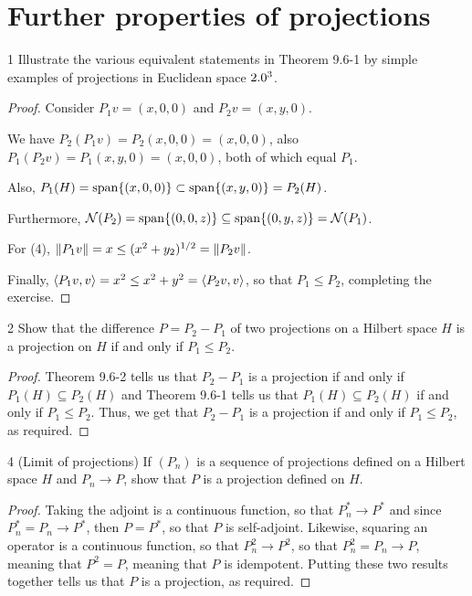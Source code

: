 \section{Further properties of projections}


\begin{exercise}{1}
Illustrate the various equivalent statements in Theorem 9.6-1 by simple examples of projections in Euclidean space $2.0^3$.
\end{exercise}
\begin{proof}
Consider $P_1 v = (x, 0, 0)$ and $P_2 v = (x, y, 0)$.

We have $P_2 (P_1 v) = P_2 (x, 0, 0) = (x, 0, 0)$, also $P_1 (P_2 v) = P_1 (x, y, 0) = (x, 0, 0)$, both of which equal $P_1$.

Also, $P_1(H) = \operatorname*{span}\{(x, 0, 0)\} \subset \operatorname*{span}\{(x, y, 0)\} = P_2(H)$.

Furthermore, $\mathcal{N}(P_2) = \operatorname*{span}\{(0, 0, z)\} \subseteq \operatorname*{span}\{(0, y, z)\} = 
\mathcal{N}(P_1)$.

For (4), $\left\lVert P_1 v\right\rVert = x \leq (x^2 + y_2)^{1/2} = \left\lVert P_2 v\right\rVert$.

Finally, $\langle P_1 v, v\rangle = x^2 \leq x^2 + y^2 = \langle P_2 v, v\rangle$, so that $P_1 \leq P_2$, completing the exercise.
\end{proof} 

\begin{exercise}{2}
Show that the difference $P = P_2 - P_1$ of two projections on a Hilbert space $H$ is a projection on $H$ if and only if $P_1 \leq P_2$.
\end{exercise}
\begin{proof}
Theorem 9.6-2 tells us that $P_2 - P_1$ is a projection if and only if $P_1(H) \subseteq P_2(H)$ and Theorem 9.6-1 tells us that $P_1(H) \subseteq P_2(H)$ if and only if $P_1 \leq P_2$.
Thus, we get that $P_2 - P_1$ is a projection if and only if $P_1 \leq P_2$, as required.
\end{proof} 

\begin{exercise}{4 (Limit of projections)}
If $(P_n)$ is a sequence of projections defined on a Hilbert space $H$ and $P_n \to P$, show that $P$ is a projection defined on $H$.
\end{exercise}
\begin{proof}
Taking the adjoint is a continuous function, so that $P_n^\ast \to P^\ast$ and since $P_n^\ast = P_n \to P^\ast$, then $P = P^\ast$, so that $P$ is self-adjoint.
Likewise, squaring an operator is a continuous function, so that $P_n^2 \to P^2$, so that $P_n^2 = P_n \to P$, meaning that $P^2 = P$, meaning that $P$ is idempotent.
Putting these two results together tells us that $P$ is a projection, as required.
\end{proof} 


